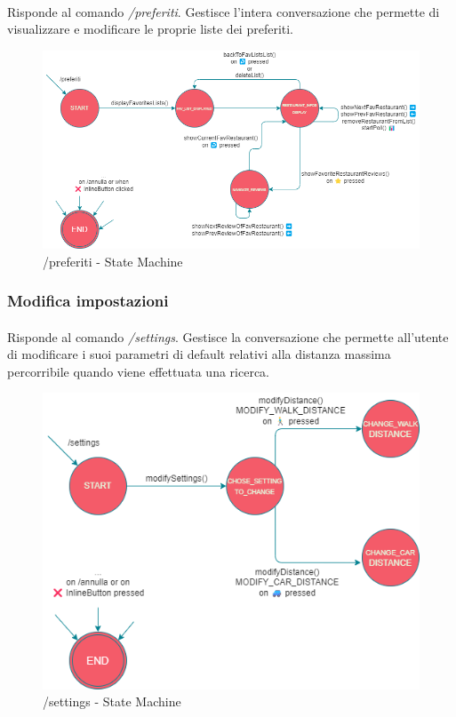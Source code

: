 \documentclass[a4paper, 12pt]{article}
\begin{document}
	\paragraph{}
	Risponde al comando \textit{/preferiti}. Gestisce l'intera conversazione che permette di visualizzare e modificare le proprie liste dei preferiti.\\
	\begin{figure}[h!]
		\centering
		\includegraphics[scale=0.6]{TasteIt_Preferiti_StateMachine.png}
		\caption{/preferiti - State Machine}
		\label{fig:PreferitiStateMachine}
	\end{figure}

	\subsubsection{Modifica impostazioni}
	\paragraph{}
	Risponde al comando \textit{/settings}. Gestisce la conversazione che permette all'utente di modificare i suoi parametri di default relativi alla distanza massima percorribile quando viene effettuata una ricerca.
	\begin{figure}[h!]
		\centering
		\includegraphics[scale=0.57]{TasteIt_Settings_StateMachine.png}
		\caption{/settings - State Machine}
		\label{fig:SettingsStateMachine}
	\end{figure}
\end{document}
